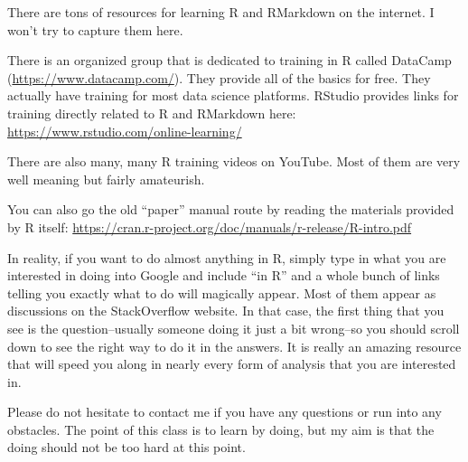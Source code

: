 \documentclass[
]{book}
\begin{document}
There are tons of resources for learning R and RMarkdown on the internet. I won't try to capture them here.

There is an organized group that is dedicated to training in R called DataCamp (\url{https://www.datacamp.com/}). They provide all of the basics for free. They actually have training for most data science platforms. RStudio provides links for training directly related to R and RMarkdown here:
\url{https://www.rstudio.com/online-learning/}

There are also many, many R training videos on YouTube. Most of them are very well meaning but fairly amateurish.

You can also go the old ``paper'' manual route by reading the materials provided by R itself:
\url{https://cran.r-project.org/doc/manuals/r-release/R-intro.pdf}

In reality, if you want to do almost anything in R, simply type in what you are interested in doing into Google and include ``in R'' and a whole bunch of links telling you exactly what to do will magically appear. Most of them appear as discussions on the StackOverflow website. In that case, the first thing that you see is the question--usually someone doing it just a bit wrong--so you should scroll down to see the right way to do it in the answers. It is really an amazing resource that will speed you along in nearly every form of analysis that you are interested in.

Please do not hesitate to contact me if you have any questions or run into any obstacles. The point of this class is to learn by doing, but my aim is that the doing should not be too hard at this point.

  
\end{document}
